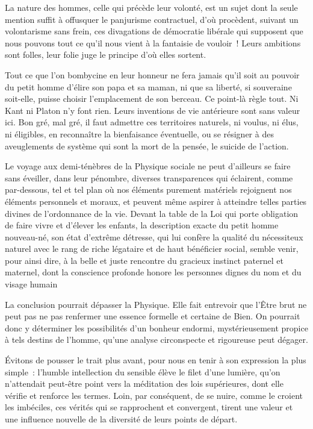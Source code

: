 \documentclass[french,twoside]{book} %
\begin{document}
La nature des hommes, celle qui précède leur volonté, est un sujet dont la seule mention suffit à offusquer le panjurisme contractuel, d’où procèdent, suivant un volontarisme sans frein, ces divagations de démocratie libérale qui supposent que nous pouvons tout ce qu’il nous vient à la fantaisie de vouloir ! Leurs ambitions sont folles, leur folie juge le principe d’où elles sortent.\par
Tout ce que l’on bombycine en leur honneur ne fera jamais qu’il soit au pouvoir du petit homme d’élire son papa et sa maman, ni que sa liberté, si souveraine soit-elle, puisse choisir l’emplacement de son berceau. Ce point-là règle tout. Ni Kant ni Platon n’y font rien. Leurs inventions de vie antérieure sont sans valeur ici. Bon gré, mal gré, il faut admettre ces territoires naturels, ni voulus, ni élus, ni éligibles, en reconnaître la bienfaisance éventuelle, ou se résigner à des aveuglements de système qui sont la mort de la pensée, le suicide de l’action.\par
Le voyage aux demi-ténèbres de la Physique sociale ne peut d’ailleurs se faire sans éveiller, dans leur pénombre, diverses transparences qui éclairent, comme par-dessous, tel et tel plan où nos éléments purement matériels rejoignent nos éléments personnels et moraux, et peuvent même aspirer à atteindre telles parties divines de l’ordonnance de la vie. Devant la table de la Loi qui porte obligation de faire vivre et d’élever les enfants, la description exacte du petit homme nouveau-né, son état d’extrême détresse, qui lui confère la qualité du nécessiteux naturel avec le rang de riche légataire et de haut bénéficier social, semble venir, pour ainsi dire, à la belle et juste rencontre du gracieux instinct paternel et maternel, dont la conscience profonde honore les personnes dignes du nom et du visage humain\par
La conclusion pourrait dépasser la Physique. Elle fait entrevoir que l’Être brut ne peut pas ne pas renfermer une essence formelle et certaine de Bien. On pourrait donc y déterminer les possibilités d’un bonheur endormi, mystérieusement propice à tels destins de l’homme, qu’une analyse circonspecte et rigoureuse peut dégager.\par
Évitons de pousser le trait plus avant, pour nous en tenir à son expression la plus simple : l’humble intellection du sensible élève le filet d’une lumière, qu’on n’attendait peut-être point vers la méditation des lois supérieures, dont elle vérifie et renforce les termes. Loin, par conséquent, de se nuire, comme le croient les imbéciles, ces vérités qui se rapprochent et convergent, tirent une valeur et une influence nouvelle de la diversité de leurs points de départ.\par
\end{document}
